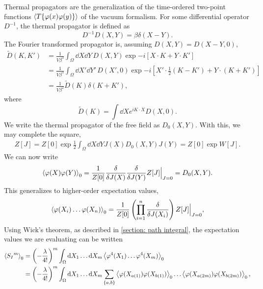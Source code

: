 %
Thermal propagators are the generalization of the time-ordered two-point functions $\left\langle T\{\varphi(x) \varphi(y) \} \right\rangle$ of the vacuum formalism.
For some differential operator $D^{-1}$, the thermal propagator is defined as
%
\begin{equation}
    D^{-1} D(X, Y) = \beta \delta(X - Y).
\end{equation}
%
The Fourier transformed propagator is, assuming $D(X, Y) = D(X-Y, 0)$,
%
\begin{align}
    \nonumber
    \tilde D(K, K') 
    & = \frac{1}{V \beta^3} \int_{\Omega} \dd X \dd Y \, 
    D(X, Y) \exp{- i [X\cdot K + Y\cdot K']} \\ \nonumber
    & = \frac{1}{V \beta^3} \int_{\Omega} \dd X' \dd Y' \, D(X', 0) 
    \exp{- i [X'\cdot \frac{1}{2} (K - K') + Y \cdot (K + K')] } \\
    & = \frac{1}{V \beta^2} \tilde D(K) \delta(K + K'),
\end{align}
where
%
\begin{equation}
    \tilde D(K) = \int \dd X e^{iK\cdot X} D(X, 0).
\end{equation}
%
We write the thermal propagator of the free field as $D_0(X, Y)$.
With this, we may complete the square,
%
\begin{align}
    Z[J] = Z[0]
    \exp{\frac{1}{2} \int_{\Omega} \dd X \dd Y J(X) D_0(X, Y) J(Y)}
    = Z[0] \exp{W[J]}.
\end{align}
We can now write
%
\begin{equation}
    \left\langle \varphi(X)\varphi(Y) \right\rangle_0 
    = \frac{1}{Z[0]}
    \frac{\delta}{\delta J(X)} \frac{\delta}{\delta J(Y)} 
    Z[J] \Big|_{J=0} 
    = D_0(X, Y).
\end{equation}
%
This generalizes to higher-order expectation values,
%
\begin{equation}
    \left\langle \varphi(X_i) \dots \varphi(X_n) \right\rangle_0
    = \frac{1}{Z[0]} \left(\prod_{i=1}^n \frac{\delta}{\delta J(X_i)}\right) 
    Z[J] \Big|_{J=0},
\end{equation}
%
Using Wick's theorem, as described in \autoref{section: path integral}, the expectation values we are evaluating can be written
%
\begin{align*}
    \left\langle {S_I}^m \right\rangle_0 & 
    = \left(- \frac{\lambda }{4!}\right)^m 
    \int_{\Omega} \text{d} X_1 \dots \text{d} X_m
    \left\langle \varphi^4(X_1) \dots \varphi^4(X_m) \right\rangle_0 \\ 
    & 
    = \left(- \frac{\lambda }{4!}\right)^m 
    \int_{\Omega} \text{d} X_1 \dots \text{d} X_m \sum_{\{a, b\}}
    \left\langle \varphi(X_{a(1)}) \varphi(X_{b(1)}) \right\rangle_0
    \dots
    \left\langle \varphi(X_{a(2m)}) \varphi(X_{b(2m)}) \right\rangle_0,
\end{align*}
